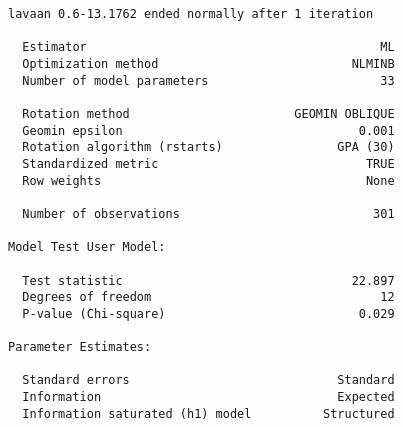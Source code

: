 \begin{verbatim}
lavaan 0.6-13.1762 ended normally after 1 iteration

  Estimator                                         ML
  Optimization method                           NLMINB
  Number of model parameters                        33

  Rotation method                       GEOMIN OBLIQUE
  Geomin epsilon                                 0.001
  Rotation algorithm (rstarts)                GPA (30)
  Standardized metric                             TRUE
  Row weights                                     None

  Number of observations                           301

Model Test User Model:
                                                      
  Test statistic                                22.897
  Degrees of freedom                                12
  P-value (Chi-square)                           0.029

Parameter Estimates:

  Standard errors                             Standard
  Information                                 Expected
  Information saturated (h1) model          Structured


\end{verbatim}
